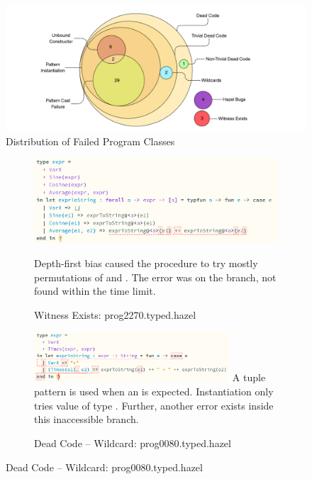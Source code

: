 \begin{figure}[h]
\centering
\includegraphics[width=1\textwidth]{Media/Figures/Failures}
\caption{Distribution of Failed Program Classes}
\label{fig:FailureDistribution}
\end{figure}

\begin{figure}
\centering
\begin{subfigure}{1\textwidth}
\includegraphics[width=1\textwidth]{Media/Figures/witness_exists}

Depth-first bias caused the procedure to try mostly permutations of  and . The error was on the  branch, not found within the time limit.
\caption{Witness Exists: prog2270.typed.hazel}
\end{subfigure}

\begin{subfigure}{1\textwidth}
\includegraphics[width=0.8\textwidth]{Media/Figures/dead_code_pattern_instantiation}
A tuple pattern is used when an  is expected. Instantiation only tries value of type . Further, another error exists inside this inaccessible branch.
\caption{Dead Code -- Wildcard: prog0080.typed.hazel}
\end{subfigure}


\end{figure}
